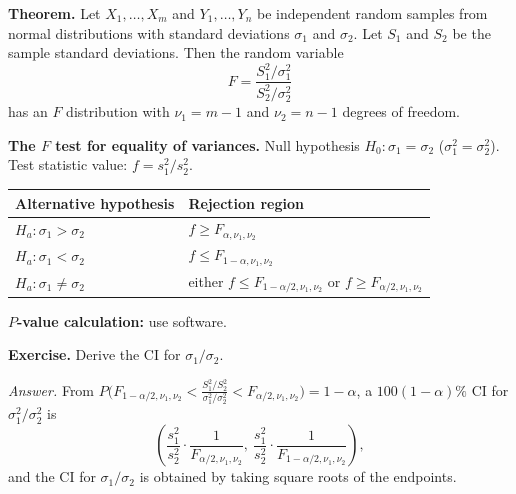 \textbf{Theorem.} Let $X_1,\dots,X_m$ and $Y_1,\dots,Y_n$ be independent random samples from normal distributions with standard deviations $\sigma_1$ and $\sigma_2$.
Let $S_1$ and $S_2$ be the sample standard deviations. Then the random variable
\[
F = \frac{S_1^2/\sigma_1^2}{S_2^2/\sigma_2^2}
\]
has an $F$ distribution with $\nu_1=m-1$ and $\nu_2=n-1$ degrees of freedom.

\textbf{The $F$ test for equality of variances.} Null hypothesis $H_0:\sigma_1=\sigma_2$ ($\sigma_1^2=\sigma_2^2$). Test statistic value: $f=s_1^2/s_2^2$.

\begin{center}
\begin{tabular}{ll}
\toprule
Alternative hypothesis & Rejection region\\
\midrule
$H_a:\sigma_1>\sigma_2$   & $f\ge F_{\alpha,\nu_1,\nu_2}$\\
$H_a:\sigma_1<\sigma_2$   & $f\le F_{1-\alpha,\nu_1,\nu_2}$\\
$H_a:\sigma_1\ne\sigma_2$ & either $f\le F_{1-\alpha/2,\nu_1,\nu_2}$ or $f\ge F_{\alpha/2,\nu_1,\nu_2}$\\
\bottomrule
\end{tabular}
\end{center}
\textbf{$P$-value calculation:} use software.

\textbf{Exercise.} Derive the CI for $\sigma_1/\sigma_2$.

\emph{Answer.} From $P\big(F_{1-\alpha/2,\nu_1,\nu_2} < \frac{S_1^2/S_2^2}{\sigma_1^2/\sigma_2^2} < F_{\alpha/2,\nu_1,\nu_2}\big)=1-\alpha$, a $100(1-\alpha)\%$ CI for $\sigma_1^2/\sigma_2^2$ is
\[
\left(\frac{s_1^2}{s_2^2}\cdot\frac{1}{F_{\alpha/2,\nu_1,\nu_2}},\ \frac{s_1^2}{s_2^2}\cdot\frac{1}{F_{1-\alpha/2,\nu_1,\nu_2}}\right),
\]
and the CI for $\sigma_1/\sigma_2$ is obtained by taking square roots of the endpoints.
